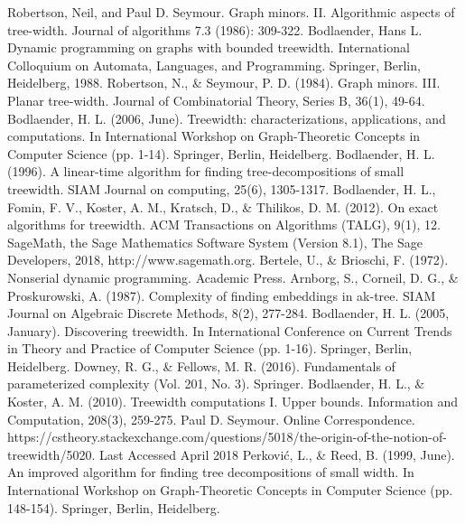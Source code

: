 \documentclass[12pt,conference]{IEEEtran}
\theoremstyle{plain}
\begin{document}
\begin{thebibliography}{1}
 Robertson, Neil, and Paul D. Seymour. Graph minors. II. Algorithmic aspects of tree-width. Journal of algorithms 7.3 (1986): 309-322.
 Bodlaender, Hans L. Dynamic programming on graphs with bounded treewidth. International Colloquium on Automata, Languages, and Programming. Springer, Berlin, Heidelberg, 1988.
 Robertson, N., \& Seymour, P. D. (1984). Graph minors. III. Planar tree-width. Journal of Combinatorial Theory, Series B, 36(1), 49-64.
 Bodlaender, H. L. (2006, June). Treewidth: characterizations, applications, and computations. In International Workshop on Graph-Theoretic Concepts in Computer Science (pp. 1-14). Springer, Berlin, Heidelberg.
 Bodlaender, H. L. (1996). A linear-time algorithm for finding tree-decompositions of small treewidth. SIAM Journal on computing, 25(6), 1305-1317.
 Bodlaender, H. L., Fomin, F. V., Koster, A. M., Kratsch, D., \& Thilikos, D. M. (2012). On exact algorithms for treewidth. ACM Transactions on Algorithms (TALG), 9(1), 12.
 SageMath, the Sage Mathematics Software System (Version 8.1), The Sage Developers, 2018, http://www.sagemath.org.
 Bertele, U., \& Brioschi, F. (1972). Nonserial dynamic programming. Academic Press.
 Arnborg, S., Corneil, D. G., \& Proskurowski, A. (1987). Complexity of finding embeddings in ak-tree. SIAM Journal on Algebraic Discrete Methods, 8(2), 277-284.
 Bodlaender, H. L. (2005, January). Discovering treewidth. In International Conference on Current Trends in Theory and Practice of Computer Science (pp. 1-16). Springer, Berlin, Heidelberg.
 Downey, R. G., \& Fellows, M. R. (2016). Fundamentals of parameterized complexity (Vol. 201, No. 3). Springer.
 Bodlaender, H. L., \& Koster, A. M. (2010). Treewidth computations I. Upper bounds. Information and Computation, 208(3), 259-275.
 Paul D. Seymour. Online Correspondence. https://cstheory.stackexchange.com/questions/5018/the-origin-of-the-notion-of-treewidth/5020. Last Accessed April 2018
 Perković, L., \& Reed, B. (1999, June). An improved algorithm for finding tree decompositions of small width. In International Workshop on Graph-Theoretic Concepts in Computer Science (pp. 148-154). Springer, Berlin, Heidelberg.

\end{thebibliography}
\end{document}
